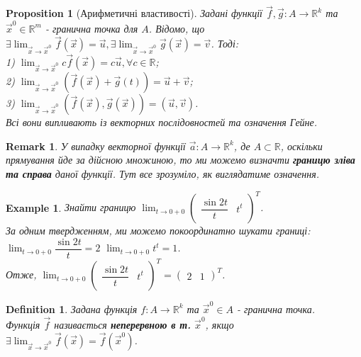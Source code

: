 \documentclass[a4paper, 10pt]{article}
\def\huge{\displaystyle}
\theoremstyle{theoremdd}
\theoremstyle{theoremdd}
\theoremstyle{theoremdd}
\newtheorem{definition}[theorem]{Definition}
\theoremstyle{theoremdd}
\theoremstyle{theoremdd}
\newtheorem{example}[theorem]{Example}
\theoremstyle{theoremdd}
\newtheorem{proposition}[theorem]{Proposition}
\theoremstyle{theoremdd}
\newtheorem{remark}[theorem]{Remark}
\theoremstyle{theoremdd}
\theoremstyle{theoremdd}
\begin{document}
\begin{proposition}[Арифметичні властивості]
Задані функції $\vec{f},\vec{g}: A \to \mathbb{R}^k$ та $\vec{x}^0 \in \mathbb{R}^m$ - гранична точка для $A$. Відомо, що \\ $\exists \huge \lim_{\vec{x} \to \vec{x}^0} \vec{f}(\vec{x}) = \vec{u}, \exists \lim_{\vec{x} \to \vec{x}^0} \vec{g}(\vec{x}) = \vec{v}$. Тоді:\\
1) $\huge \lim_{\vec{x} \to \vec{x}^0} c \vec{f}(\vec{x}) = c \vec{u}, \forall c \in \mathbb{R}$;\\
2) $\huge \lim_{\vec{x} \to \vec{x}^0} (\vec{f}(\vec{x}) + \vec{g}(t)) = \vec{u} + \vec{v}$;\\
3) $\huge \lim_{\vec{x} \to \vec{x}^0} (\vec{f}(\vec{x}),\vec{g}(\vec{x})) = (\vec{u},\vec{v})$.\\
\textit{Всі вони випливають із векторних послідовностей та означення Гейне.}
\end{proposition}

\begin{remark}
У випадку векторної функції $\vec{a}: A \to \mathbb{R}^k$, де $A \subset \mathbb{R}$, оскільки прямування йде за дійсною множиною, то ми можемо визначти \textbf{границю зліва та справа} даної функції. Тут все зрозуміло, як виглядатиме означення.
\end{remark}

\begin{example}
Знайти границю $\huge\lim_{t \to 0+0} \begin{pmatrix}
\dfrac{\sin 2t}{t} & t^t
\end{pmatrix}^T$.\\
За одним твердженням, ми можемо покоординатно шукати границі:\\
$\huge\lim_{t \to 0+0} \dfrac{\sin 2t}{t} = 2$ \hspace{1cm} $\huge\lim_{t \to 0+0} t^t = 1$.\\
Отже, $\huge\lim_{t \to 0+0} \begin{pmatrix}
\dfrac{\sin 2t}{t} & t^t
\end{pmatrix}^T = \begin{pmatrix}
2 & 1
\end{pmatrix}^T$.
\end{example}

\begin{definition}
Задана функція $f: A \to \mathbb{R}^k$ та $\vec{x}^0 \in A$ - гранична точка.\\
Функція $\vec{f}$ називається \textbf{неперервною в т.} $\vec{x}^0$, якщо $\exists \huge \lim_{\vec{x} \to \vec{x}^0} \vec{f}(\vec{x}) = \vec{f}(\vec{x}^0)$.
\end{definition}
\end{document}
